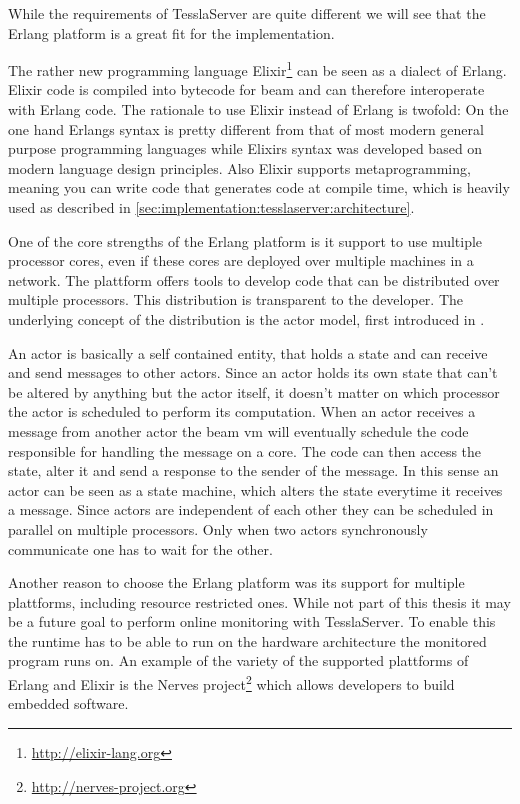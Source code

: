 While the requirements of TesslaServer are quite different we will see that the Erlang platform is a great fit for the implementation.

The rather new programming language Elixir\footnote{\url{http://elixir-lang.org}} can be seen as a dialect of Erlang.
Elixir code is compiled into bytecode for \gls{beam} and can therefore interoperate with Erlang code.
The rationale to use Elixir instead of Erlang is twofold:
On the one hand Erlangs syntax is pretty different from that of most modern general purpose programming languages while Elixirs syntax was developed based on modern language design principles.
Also Elixir supports metaprogramming, meaning you can write code that generates code at compile time, which is heavily used as described in \cref{sec:implementation:tesslaserver:architecture}.

One of the core strengths of the Erlang platform is it support to use multiple processor cores, even if these cores are deployed over multiple machines in a network.
The plattform offers tools to develop code that can be distributed over multiple processors.
This distribution is transparent to the developer.
The underlying concept of the distribution is the actor model, first introduced in \cite{Hewitt1973}.

An actor is basically a self contained entity, that holds a state and can receive and send messages to other actors.
Since an actor holds its own state that can't be altered by anything but the actor itself, it doesn't matter on which processor the actor is scheduled to perform its computation.
When an actor receives a message from another actor the \gls{beam} \gls{vm} will eventually schedule the code responsible for handling the message on a core.
The code can then access the state, alter it and send a response to the sender of the message.
In this sense an actor can be seen as a state machine, which alters the state everytime it receives a message.
Since actors are independent of each other they can be scheduled in parallel on multiple processors.
Only when two actors synchronously communicate one has to wait for the other.


Another reason to choose the Erlang platform was its support for multiple plattforms, including resource restricted ones.
While not part of this thesis it may be a future goal to perform online monitoring with TesslaServer.
To enable this the runtime has to be able to run on the hardware architecture the monitored program runs on.
An example of the variety of the supported plattforms of Erlang and Elixir is the Nerves project\footnote{\url{http://nerves-project.org}} which allows developers to build embedded software.



